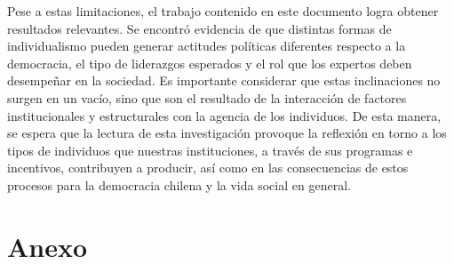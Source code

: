 \documentclass[12pt,twoside]{templates/facsothesis}
\begin{document}
Pese a estas limitaciones, el trabajo contenido en este documento logra obtener resultados relevantes. Se encontró evidencia de que distintas formas de individualismo pueden generar actitudes políticas diferentes respecto a la democracia, el tipo de liderazgos esperados y el rol que los expertos deben desempeñar en la sociedad. Es importante considerar que estas inclinaciones no surgen en un vacío, sino que son el resultado de la interacción de factores institucionales y estructurales con la agencia de los individuos. De esta manera, se espera que la lectura de esta investigación provoque la reflexión en torno a los tipos de individuos que nuestras instituciones, a través de sus programas e incentivos, contribuyen a producir, así como en las consecuencias de estos procesos para la democracia chilena y la vida social en general.


\pagestyle{fancyplain}
\fancyhf{}
	 \fancyfoot[C]{\thepage}
{}




\hypertarget{Anexo}{%
\chapter*{Anexo}\label{Anexo}}
\end{document}
